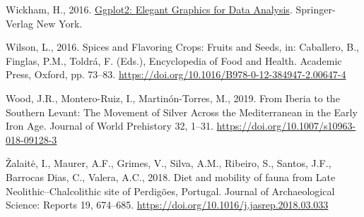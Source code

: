 \documentclass[preprint, 3p, authoryear]{elsarticle} %
\newlength{\cslhangindent}
\newlength{\cslentryspacingunit} %
\newenvironment{CSLReferences}[2] %
 {%
  \setlength{\parindent}{0pt}
  \ifodd #1
  \let\oldpar\par
  \def\par{\hangindent=\cslhangindent\oldpar}
  \fi
  \setlength{\parskip}{#2\cslentryspacingunit}
 }%
 {}
\begin{document}
\begin{CSLReferences}{1}{0}
\leavevmode{}%
Wickham, H., 2016. \href{https://ggplot2.tidyverse.org}{Ggplot2: {Elegant Graphics} for {Data Analysis}}. {Springer-Verlag New York}.

\leavevmode{}%
Wilson, L., 2016. Spices and {Flavoring Crops}: {Fruits} and {Seeds}, in: Caballero, B., Finglas, P.M., Toldrá, F. (Eds.), Encyclopedia of {Food} and {Health}. {Academic Press}, {Oxford}, pp. 73--83. \url{https://doi.org/10.1016/B978-0-12-384947-2.00647-4}

\leavevmode{}%
Wood, J.R., Montero-Ruiz, I., Martinón-Torres, M., 2019. From {Iberia} to the {Southern Levant}: {The Movement} of {Silver Across} the {Mediterranean} in the {Early Iron Age}. Journal of World Prehistory 32, 1--31. \url{https://doi.org/10.1007/s10963-018-09128-3}

\leavevmode{}%
Žalaitė, I., Maurer, A.F., Grimes, V., Silva, A.M., Ribeiro, S., Santos, J.F., Barrocas Dias, C., Valera, A.C., 2018. Diet and mobility of fauna from {Late Neolithic}--{Chalcolithic} site of {Perdigões}, {Portugal}. Journal of Archaeological Science: Reports 19, 674--685. \url{https://doi.org/10.1016/j.jasrep.2018.03.033}

\end{CSLReferences}
\end{document}
